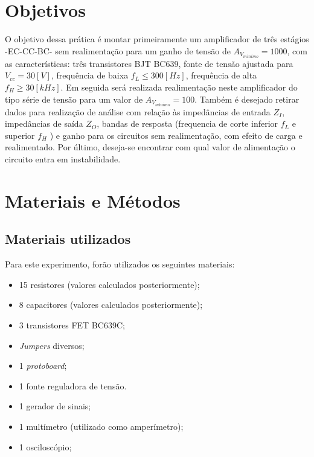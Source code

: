 \documentclass[openright]{normas-utf-tex} %
\begin{document}
\chapter{Objetivos}

O objetivo dessa prática é montar primeiramente um amplificador de três estágios -EC-CC-BC- sem realimentação para um ganho de tensão de $A_{V_{minimo}} = 1000$, com as características: três transistores BJT BC639, fonte de tensão ajustada para $V_{cc} = 30[V]$, frequência de baixa $f_L \leq 300[Hz]$, frequência de alta $f_H \geq 30[kHz]$. Em seguida será realizada realimentação neste amplificador do tipo série de tensão para um valor de $A_{V_{mínimo}} = 100$. Também é desejado retirar dados para realização de análise com relação às impedâncias de entrada $Z_I$, impedâncias de saída $Z_O$, bandas de resposta (frequencia de corte inferior $f_L$ e superior $f_H$ ) e ganho para os circuitos sem realimentação, com efeito de carga e realimentado. Por último, deseja-se encontrar com qual valor de alimentação o circuito entra em instabilidade.

\chapter{Materiais e Métodos}
\label{chap:desenvolvimento}





\section{Materiais utilizados}
\label{sec:mat}
Para este experimento, forão utilizados os seguintes materiais:
\begin{itemize}
\item 15 resistores (valores calculados posteriormente);
\item 8 capacitores (valores calculados posteriormente);
\item 3 transistores FET BC639C;
\item \textit{Jumpers} diversos;
\item 1 \textit{protoboard};
\item 1 fonte reguladora de tensão.
\item 1 gerador de sinais;
\item 1 multímetro (utilizado como amperímetro);
\item 1 osciloscópio;
\end{itemize}
\end{document}
